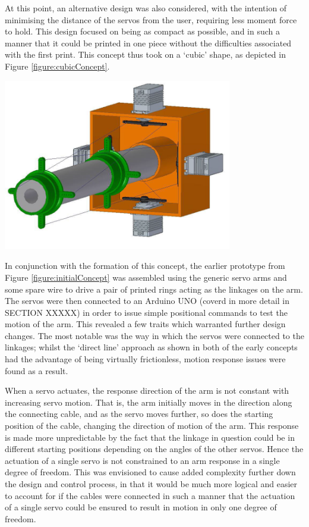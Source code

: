 \documentclass[11pt]{article}
\begin{document}
At this point, an alternative design was also considered, with the intention of minimising the distance of the servos from the user, requiring less moment force to hold. This design focused on being as compact as possible, and in such a manner that it could be printed in one piece without the difficulties associated with the first print. This concept thus took on a `cubic' shape, as depicted in Figure \ref{figure:cubicConcept}.

\begin{center}
\includegraphics[width=0.75\textwidth]{images/cubicConcept.png}
\label{figure:cubicConcept}
\end{center}

In conjunction with the formation of this concept, the earlier prototype from Figure \ref{figure:initialConcept} was assembled using the generic servo arms and some spare wire to drive a pair of printed rings acting as the linkages on the arm. The servos were then connected to an Arduino UNO (coverd in more detail in SECTION XXXXX) in order to issue simple positional commands to test the motion of the arm. This revealed a few traits which warranted further design changes. The most notable was the way in which the servos were connected to the linkages; whilst the `direct line' approach as shown in both of the early concepts had the advantage of being virtually frictionless, motion response issues were found as a result. 

When a servo actuates, the response direction of the arm is not constant with increasing servo motion. That is, the arm initially moves in the direction along the connecting cable, and as the servo moves further, so does the starting position of the cable, changing the direction of motion of the arm. This response is made more unpredictable by the fact that the linkage in question could be in different starting positions depending on the angles of the other servos. Hence the actuation of a single servo is not constrained to an arm response in a single degree of freedom. This was envisioned to cause added complexity further down the design and control process, in that it would be much more logical and easier to account for if the cables were connected in such a manner that the actuation of a single servo could be ensured to result in motion in only one degree of freedom.
\end{document}
